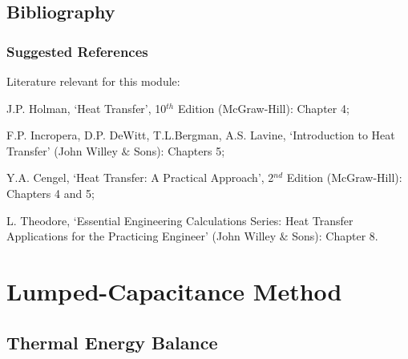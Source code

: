 \documentclass[10pt,compress,unknownkeysallowed]{beamer}
\begin{document}
\subsection{Bibliography} 

\begin{frame}
 \frametitle{Suggested References}
  Literature relevant for this module:
  \begin{enumerate}[{[}1{]}]
    \item J.P. Holman, `Heat Transfer', 10$^{th}$ Edition (McGraw-Hill): Chapter 4;
    \item F.P. Incropera, D.P. DeWitt, T.L.Bergman, A.S. Lavine, `Introduction to Heat Transfer' (John Willey $\&$ Sons): Chapters 5;
    \item Y.A. Cengel, `Heat Transfer: A Practical Approach', 2$^{nd}$ Edition (McGraw-Hill): Chapters 4 and 5;
    \item L. Theodore, `Essential Engineering Calculations Series: Heat Transfer Applications for the Practicing Engineer' (John Willey $\&$ Sons): Chapter 8.
  \end{enumerate}
\end{frame}

\section{Lumped-Capacitance Method}


\subsection{Thermal Energy Balance}
\end{document}
